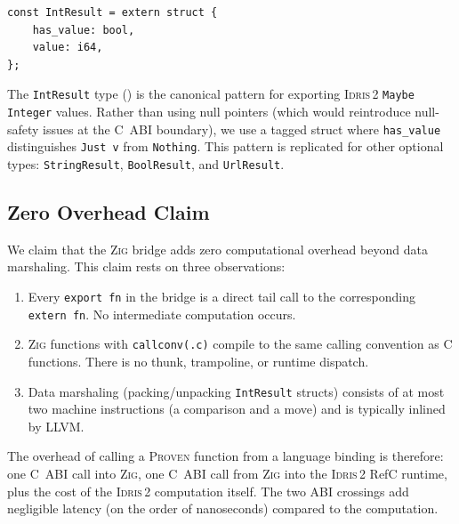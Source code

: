 \documentclass[11pt,a4paper]{article}
\newcommand{\proven}{\textsc{Proven}}
\newcommand{\idris}{\textsc{Idris\,2}}
\newcommand{\zig}{\textsc{Zig}}
\newcommand{\code}[1]{\texttt{#1}}
\begin{document}
\begin{lstlisting}[language=Zig, caption={Result type for integer
operations. The \code{has\_value} flag and \code{value} field encode
\idris{}'s \code{Maybe Integer} as a C-compatible struct.},
label=lst:int-result]
const IntResult = extern struct {
    has_value: bool,
    value: i64,
};
\end{lstlisting}

The \code{IntResult} type () is the canonical
pattern for exporting \idris{} \code{Maybe Integer} values. Rather than
using null pointers (which would reintroduce null-safety issues at the
C~ABI boundary), we use a tagged struct where \code{has\_value}
distinguishes \code{Just v} from \code{Nothing}. This pattern is
replicated for other optional types: \code{StringResult},
\code{BoolResult}, and \code{UrlResult}.

\subsection{Zero Overhead Claim}

We claim that the \zig{} bridge adds zero computational overhead beyond
data marshaling. This claim rests on three observations:

\begin{enumerate}[nosep]
  \item Every \code{export fn} in the bridge is a direct tail call to the
    corresponding \code{extern fn}. No intermediate computation occurs.
  \item \zig{} functions with \code{callconv(.c)} compile to the same
    calling convention as C functions. There is no thunk, trampoline, or
    runtime dispatch.
  \item Data marshaling (packing/unpacking \code{IntResult} structs)
    consists of at most two machine instructions (a comparison and a
    move) and is typically inlined by LLVM.
\end{enumerate}

The overhead of calling a \proven{} function from a language binding is
therefore: one C~ABI call into \zig{}, one C~ABI call from \zig{} into
the \idris{} RefC runtime, plus the cost of the \idris{} computation
itself. The two ABI crossings add negligible latency (on the order of
nanoseconds) compared to the computation.


\end{document}
